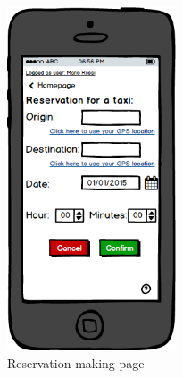 \begin{figure}[H]
    \centering
    \includegraphics[width=5cm]{./Mockups/Reservation.png}
    \caption{Reservation making page}
\end{figure}
